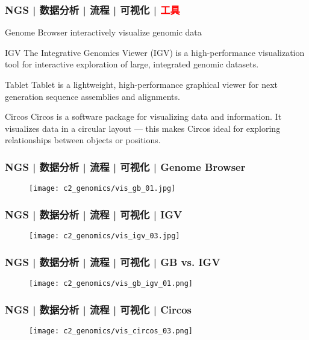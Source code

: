 \begin{frame}
  \frametitle{NGS | 数据分析 | 流程 | 可视化 | \textcolor{red}{工具}}
  \begin{block}{Genome Browser}
    interactively visualize genomic data
  \end{block}
  \pause
  \begin{block}{IGV}
    The Integrative Genomics Viewer (IGV) is a high-performance visualization tool for interactive exploration of large, integrated genomic datasets.
  \end{block}
  \pause
  \begin{block}{Tablet}
    Tablet is a lightweight, high-performance graphical viewer for next generation sequence assemblies and alignments.
  \end{block}
  \pause
  \begin{block}{Circos}
    Circos is a software package for visualizing data and information. It visualizes data in a circular layout --- this makes Circos ideal for exploring relationships between objects or positions.
  \end{block}
\end{frame}

\begin{frame}
  \frametitle{NGS | 数据分析 | 流程 | 可视化 | Genome Browser}
  \begin{figure}
    \centering
    \texttt{[image: c2\_genomics/vis\_gb\_01.jpg]}
  \end{figure}
\end{frame}

\begin{frame}
  \frametitle{NGS | 数据分析 | 流程 | 可视化 | IGV}
  \begin{figure}
    \centering
    \texttt{[image: c2\_genomics/vis\_igv\_03.jpg]}
  \end{figure}
\end{frame}

\begin{frame}
  \frametitle{NGS | 数据分析 | 流程 | 可视化 | GB vs. IGV}
  \begin{figure}
    \centering
    \texttt{[image: c2\_genomics/vis\_gb\_igv\_01.png]}
  \end{figure}
\end{frame}

\begin{frame}
  \frametitle{NGS | 数据分析 | 流程 | 可视化 | Circos}
  \begin{figure}
    \centering
    \texttt{[image: c2\_genomics/vis\_circos\_03.png]}
  \end{figure}
\end{frame}

